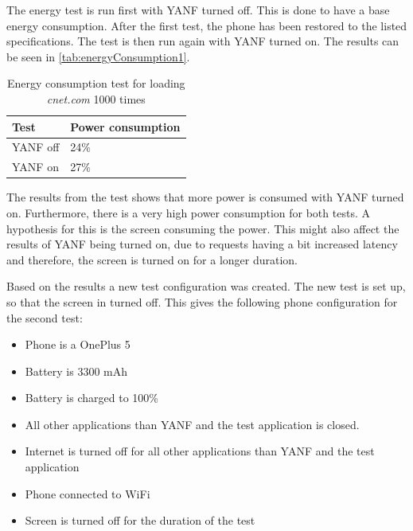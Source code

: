 \documentclass[main.tex]{subfiles}
\begin{document}

The energy test is run first with YANF turned off. This is done to have a base energy consumption. After the first test, the phone has been restored to the listed specifications. The test is then run again with YANF turned on. The results can be seen in \autoref{tab:energyConsumption1}.

\begin{table}[H]
    \centering
    \begin{tabular}{|l|l|}\hline
        \textbf{Test}   & \textbf{Power consumption}    \\ \hline
        YANF off         & 24\%                          \\ \hline
        YANF on        & 27\%                          \\ \hline
    \end{tabular}
    \caption{Energy consumption test for  loading \textit{cnet.com} 1000 times}
    \label{tab:energyConsumption1}
\end{table}

The results from the test shows that more power is consumed with YANF turned on. Furthermore, there is a very high power consumption for both tests. A hypothesis for this is the screen consuming the power. This might also affect the results of YANF being turned on, due to requests having a bit increased latency and therefore, the screen is turned on for a longer duration.

Based on the results a new test configuration was created. The new test is set up, so that the screen in turned off. This gives the following phone configuration for the second test:

\begin{itemize}
    \item Phone is a OnePlus 5
    \item Battery is 3300 mAh
    \item Battery is charged to 100\%
    \item All other applications than YANF and the test application is closed. 
    \item Internet is turned off for all other applications than YANF and the test application
    \item Phone connected to WiFi
    \item Screen is turned off for the duration of the test
\end{itemize}
\end{document}

